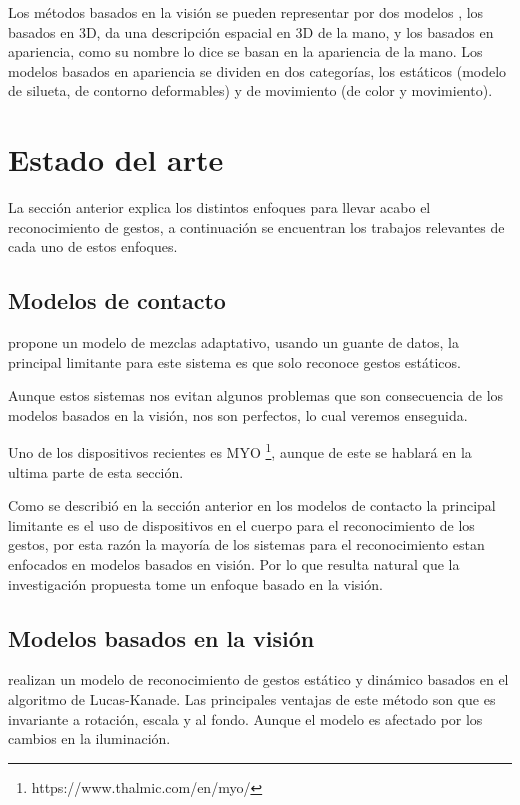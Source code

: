 Los métodos basados en la visión se pueden representar por dos modelos \citep{Rautaray2012}, los basados en 3D, da una descripción espacial en 3D de la mano, y los basados en apariencia, como su nombre lo dice se basan en la apariencia de la mano. Los modelos basados en apariencia se dividen en dos categorías, los estáticos (modelo de silueta, de contorno deformables) y de movimiento (de color y movimiento).


\section{Estado del arte}\label{EstadoDelArte} 

La sección anterior explica los distintos enfoques para llevar acabo el reconocimiento de gestos, a continuación se encuentran los trabajos relevantes de cada uno de estos enfoques. 

\subsection{Modelos de contacto}

\citep{Yoon2012} propone un modelo de mezclas adaptativo, usando un guante de datos, la principal limitante para este sistema es que solo reconoce gestos estáticos. 

Aunque estos sistemas nos evitan algunos problemas que son consecuencia de los modelos basados en la visión, nos son perfectos, lo cual veremos enseguida.  

Uno de los dispositivos recientes es MYO \footnote{https://www.thalmic.com/en/myo/}, aunque de este se hablar\'a en la ultima parte de esta secci\'on. 

Como se describi\'o en la secci\'on anterior en los modelos de contacto la principal limitante es el uso de dispositivos en el cuerpo para el reconocimiento de los gestos, por esta raz\'on la mayor\'ia de los sistemas para el reconocimiento estan enfocados en modelos basados en visi\'on. Por lo que resulta natural que la investigaci\'on propuesta tome un enfoque basado en la visi\'on.

\subsection{Modelos basados en la visi\'on}  

\cite{Premaratne2013} realizan un modelo de reconocimiento de gestos est\'atico y din\'amico basados en el algoritmo de Lucas-Kanade. Las principales ventajas de este m\'etodo son que es invariante a rotaci\'on, escala y al fondo. Aunque el modelo es afectado por los cambios en la iluminaci\'on.

